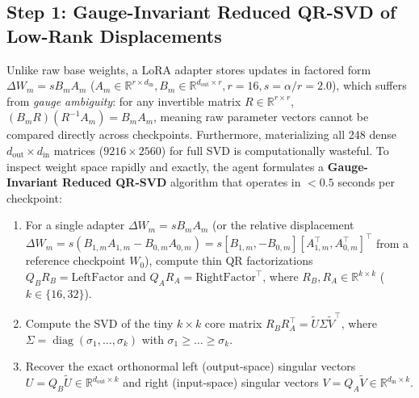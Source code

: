 \documentclass[11pt,a4paper]{article}
\begin{document}
\subsection{Step 1: Gauge-Invariant Reduced QR-SVD of Low-Rank Displacements}
Unlike raw base weights, a LoRA adapter stores updates in factored form $\Delta W_m = s B_m A_m$ ($A_m \in \mathbb{R}^{r \times d_{\text{in}}}, B_m \in \mathbb{R}^{d_{\text{out}} \times r}, r=16, s=\alpha/r=2.0$), which suffers from \emph{gauge ambiguity}: for any invertible matrix $R \in \mathbb{R}^{r \times r}$, $(B_m R)(R^{-1} A_m) = B_m A_m$, meaning raw parameter vectors cannot be compared directly across checkpoints. Furthermore, materializing all 248 dense $d_{\text{out}} \times d_{\text{in}}$ matrices ($9216 \times 2560$) for full SVD is computationally wasteful. To inspect weight space rapidly and exactly, the agent formulates a \textbf{Gauge-Invariant Reduced QR-SVD} algorithm that operates in $<0.5$ seconds per checkpoint:
\begin{enumerate}
    \item For a single adapter $\Delta W_m = s B_m A_m$ (or the relative displacement $\Delta W_m = s(B_{1,m} A_{1,m} - B_{0,m} A_{0,m}) = s [B_{1,m}, -B_{0,m}] [A_{1,m}^\top, A_{0,m}^\top]^\top$ from a reference checkpoint $W_0$), compute thin QR factorizations $Q_B R_B = \text{LeftFactor}$ and $Q_A R_A = \text{RightFactor}^\top$, where $R_B, R_A \in \mathbb{R}^{k \times k}$ ($k \in \{16, 32\}$).
    \item Compute the SVD of the tiny $k \times k$ core matrix $R_B R_A^\top = \tilde{U} \Sigma \tilde{V}^\top$, where $\Sigma = \operatorname{diag}(\sigma_1, \dots, \sigma_k)$ with $\sigma_1 \ge \dots \ge \sigma_k$.
    \item Recover the exact orthonormal left (output-space) singular vectors $U = Q_B \tilde{U} \in \mathbb{R}^{d_{\text{out}} \times k}$ and right (input-space) singular vectors $V = Q_A \tilde{V} \in \mathbb{R}^{d_{\text{in}} \times k}$.
\end{enumerate}
\end{document}
